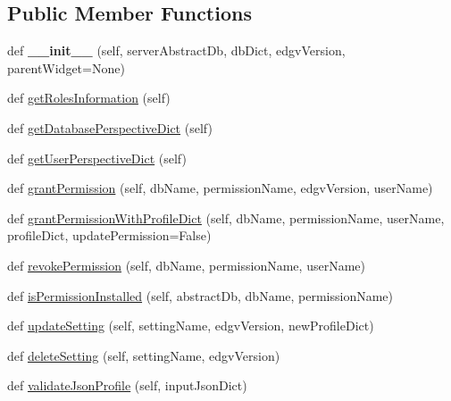 \subsection*{Public Member Functions}
\begin{DoxyCompactItemize}
\item 
\mbox{\label{class_dsg_tools_1_1_server_management_tools_1_1permission_manager_1_1_permission_manager_a3819ddfd6d283080ceff2aabe67e12b4}} 
def {\bfseries \+\_\+\+\_\+init\+\_\+\+\_\+} (self, server\+Abstract\+Db, db\+Dict, edgv\+Version, parent\+Widget=None)
\item 
def \mbox{\hyperlink{class_dsg_tools_1_1_server_management_tools_1_1permission_manager_1_1_permission_manager_a164d75a558e236cd4c76cb0c451d513a}{get\+Roles\+Information}} (self)
\item 
def \mbox{\hyperlink{class_dsg_tools_1_1_server_management_tools_1_1permission_manager_1_1_permission_manager_a11c1a21b45f76b92225d78962b8b8e55}{get\+Database\+Perspective\+Dict}} (self)
\item 
def \mbox{\hyperlink{class_dsg_tools_1_1_server_management_tools_1_1permission_manager_1_1_permission_manager_acfa6084229b7e956dc6d3acaf77c99a7}{get\+User\+Perspective\+Dict}} (self)
\item 
def \mbox{\hyperlink{class_dsg_tools_1_1_server_management_tools_1_1permission_manager_1_1_permission_manager_a9c74d6bdc2984793dfc39d964893819a}{grant\+Permission}} (self, db\+Name, permission\+Name, edgv\+Version, user\+Name)
\item 
def \mbox{\hyperlink{class_dsg_tools_1_1_server_management_tools_1_1permission_manager_1_1_permission_manager_ac2a41f0388c97371d3e00f30e66519b6}{grant\+Permission\+With\+Profile\+Dict}} (self, db\+Name, permission\+Name, user\+Name, profile\+Dict, update\+Permission=False)
\item 
def \mbox{\hyperlink{class_dsg_tools_1_1_server_management_tools_1_1permission_manager_1_1_permission_manager_a3ad2577af28425c49f5013968937dde5}{revoke\+Permission}} (self, db\+Name, permission\+Name, user\+Name)
\item 
def \mbox{\hyperlink{class_dsg_tools_1_1_server_management_tools_1_1permission_manager_1_1_permission_manager_afa4a334bad05fec83bdcb570ac716aaa}{is\+Permission\+Installed}} (self, abstract\+Db, db\+Name, permission\+Name)
\item 
def \mbox{\hyperlink{class_dsg_tools_1_1_server_management_tools_1_1permission_manager_1_1_permission_manager_a26e0604c4107fc31713534e7a939de30}{update\+Setting}} (self, setting\+Name, edgv\+Version, new\+Profile\+Dict)
\item 
def \mbox{\hyperlink{class_dsg_tools_1_1_server_management_tools_1_1permission_manager_1_1_permission_manager_abee84dfa73d922862781908b64c8258a}{delete\+Setting}} (self, setting\+Name, edgv\+Version)
\item 
def \mbox{\hyperlink{class_dsg_tools_1_1_server_management_tools_1_1permission_manager_1_1_permission_manager_adcea6c57b219fa85a4e0c3ffa648c1ec}{validate\+Json\+Profile}} (self, input\+Json\+Dict)
\end{DoxyCompactItemize}
